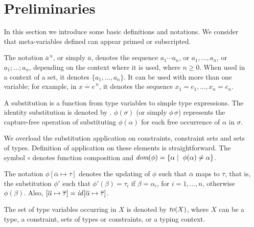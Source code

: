 \section{Preliminaries}\label{prelimirares}

In this section we introduce some basic definitions and notations. We
consider that meta-variables defined can appear primed or subscripted.


The notation $\overline{a}^{\,n}$, or simply $\overline{a}$, denotes
the sequence $a_1 \cdots a_n$, or $a_1, \ldots, a_n$, or
$a_1;\ldots;a_n$, depending on the context where it is used, where
$n\geq 0$. When used in a context of a set, it denotes
$\{a_1,\ldots,a_n\}$. It can be used with more than one variable; for
example, in $\overline{x = e}^{\,n}$, it denotes the sequence
$x_1=e_1, \ldots, x_n = e_n$.

A substitution is a function from type variables to simple type
expressions. The identity substitution is denoted by
\id. $\phi(\sigma)$ (or simply $\phi\,\sigma$) represents the
capture-free operation of substituting $\phi(\alpha)$ for each free
occurrence of $\alpha$ in $\sigma$.

We overload the substitution application on constraints, constraint
sets and sets of types. Definition of application on these elements is
straightforward. The symbol $\circ$ denotes function composition and
$\textit{dom}(\phi)=\{\alpha \mid\ \phi(\alpha) \neq \alpha\}$.

The notation $\phi[\overline{\alpha}\mapsto\overline{\tau}]$ denotes
the updating of $\phi$ such that $\overline{\alpha}$ maps to
$\overline{\tau}$, that is, the substitution $\phi'$ such that
$\phi'(\beta) = \tau_i$ if $\beta = \alpha_i$, for $i = 1,...,n$,
otherwise $\phi(\beta)$. Also, $[\overline{\alpha}\mapsto\overline{\tau}]
= \text{\it id\/}[\overline{\alpha}\mapsto\overline{\tau}]$.

The set of type variables occurring in $X$ is denoted by $\text{\it tv\/}(X)$,
where $X$ can be a type, a constraint, sets of types or constraints,
or a typing context.
